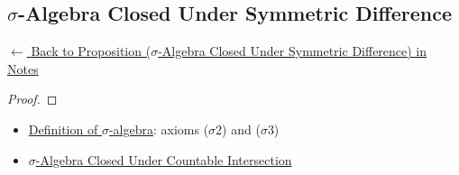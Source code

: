 
\subsection*{$\sigma$-Algebra Closed Under Symmetric Difference}
\label{prf:sigma-closed-symmdiff}

\begin{remark*}[Return]
\hyperref[prop:sigma-closed-symmdiff]{$\leftarrow$ Back to Proposition ($\sigma$-Algebra Closed Under Symmetric Difference) in Notes}
\end{remark*}

\begin{proof}
\end{proof}

\begin{remark*}

\end{remark*}

\begin{remark*}[Dependencies]
\begin{itemize}
  \item \hyperref[def:sigma-algebra]{Definition of $\sigma$-algebra}: axioms ($\sigma$2) and ($\sigma$3)
  \item \hyperref[prop:sigma-closed-countable-intersection]{$\sigma$-Algebra Closed Under Countable Intersection}
\end{itemize}

\end{remark*}
